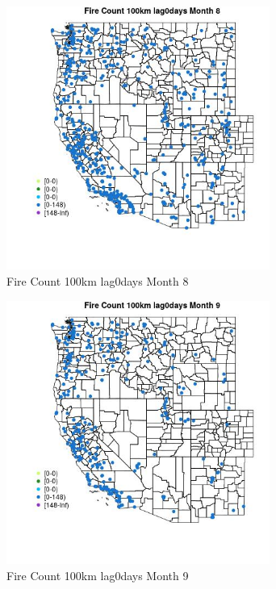 \begin{figure} 
\centering  
\includegraphics[width=0.77\textwidth]{Code_Outputs/Report_ML_input_PM25_Step4_part_e_de_duplicated_aves_compiled_2019-05-18wNAs_MapObsMo8Fire_Count_100km_lag0days.jpg} 
\caption{\label{fig:Report_ML_input_PM25_Step4_part_e_de_duplicated_aves_compiled_2019-05-18wNAsMapObsMo8Fire_Count_100km_lag0days}Fire Count 100km lag0days Month 8} 
\end{figure} 
 

\begin{figure} 
\centering  
\includegraphics[width=0.77\textwidth]{Code_Outputs/Report_ML_input_PM25_Step4_part_e_de_duplicated_aves_compiled_2019-05-18wNAs_MapObsMo9Fire_Count_100km_lag0days.jpg} 
\caption{\label{fig:Report_ML_input_PM25_Step4_part_e_de_duplicated_aves_compiled_2019-05-18wNAsMapObsMo9Fire_Count_100km_lag0days}Fire Count 100km lag0days Month 9} 
\end{figure} 
 

